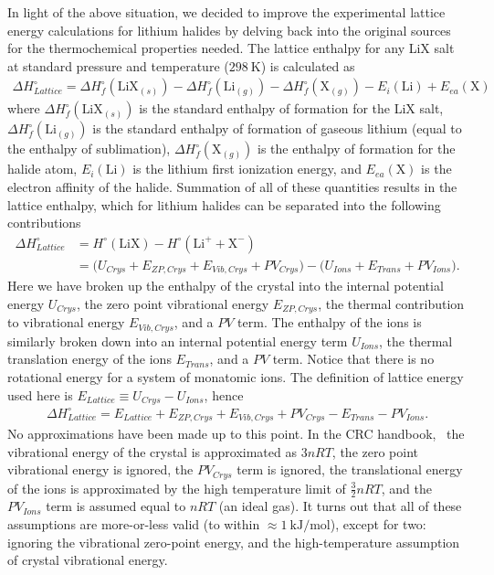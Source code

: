 \documentclass[titlepage,11pt]{article}
\begin{document}
In light of the above situation, we decided to improve the experimental lattice energy calculations for lithium halides by delving back into the original sources for the thermochemical properties needed. The lattice enthalpy for any LiX salt at standard pressure and temperature ($\SI{298}{\kelvin}$) is calculated as
\begin{align}
 \Delta H^{\circ}_{Lattice} = \Delta H^{\circ}_{f} (\text{LiX}_{(s)}) - \Delta H_{f}^{\circ} (\text{Li}_{(g)}) - \Delta H^{\circ}_{f} (\text{X}_{(g)}) - E_{i} (\text{Li}) + E_{ea} (\text{X})
\end{align}
where $\Delta H^{\circ}_{f} (\text{LiX}_{(s)})$ is the standard enthalpy of formation for the LiX salt, $\Delta H_{f}^{\circ} (\text{Li}_{(g)})$ is the standard enthalpy of formation of gaseous lithium (equal to the enthalpy of sublimation), $\Delta H^{\circ}_{f} (\text{X}_{(g)})$ is the enthalpy of formation for the halide atom, $E_{i} (\text{Li})$ is the lithium first ionization energy, and $E_{ea} (\text{X})$ is the electron affinity of the halide. Summation of all of these quantities results in the lattice enthalpy, which for lithium halides can be separated into the following contributions
\begin{align}
\Delta H^{\circ}_{Lattice} &= H^{\circ}(\text{LiX}) - H^{\circ} (\text{Li}^{+} + \text{X}^{-})\\
&= \big( U_{Crys} + E_{ZP,Crys} + E_{Vib,Crys} + PV_{Crys} \big) - \big( U_{Ions} + E_{Trans} + PV_{Ions} \big).
\end{align}
Here we have broken up the enthalpy of the crystal into the internal potential energy $U_{Crys}$, the zero point vibrational energy $E_{ZP,Crys}$, the thermal contribution to vibrational energy $E_{Vib,Crys}$, and a $PV$ term. The enthalpy of the ions is similarly broken down into an internal potential energy term $U_{Ions}$, the thermal translation energy of the ions $E_{Trans}$, and a $PV$ term. Notice that there is no rotational energy for a system of monatomic ions. The definition of lattice energy used here is $E_{Lattice} \equiv U_{Crys} - U_{Ions}$, hence
\begin{align}
\Delta H^{\circ}_{Lattice} = E_{Lattice} + E_{ZP,Crys} + E_{Vib,Crys} + PV_{Crys} - E_{Trans} - PV_{Ions}.
\end{align}
No approximations have been made up to this point. In the CRC handbook,~\cite{book:CRC} the vibrational energy of the crystal is approximated as $3nRT$, the zero point vibrational energy is ignored, the $PV_{Crys}$ term is ignored, the translational energy of the ions is approximated by the high temperature limit of $\frac{3}{2}n R T$, and the $PV_{Ions}$ term is assumed equal to $n R T$ (an ideal gas). It turns out that all of these assumptions are more-or-less valid (to within $\approx \SI{1}{\kilo\joule\per\mole}$), except for two: ignoring the vibrational zero-point energy, and the high-temperature assumption of crystal vibrational energy.
\end{document}
